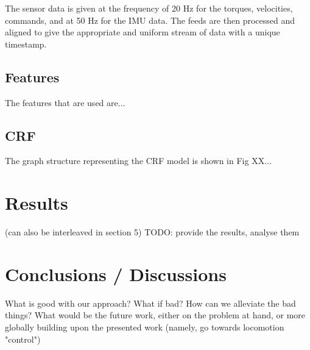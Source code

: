 \documentclass[a4paper, 10pt, conference]{ieeeconf}
\begin{document}
The sensor data is given at the frequency of 20 Hz for the torques, velocities, commands, and at 50 Hz for the IMU data. The feeds are then processed and aligned to give the appropriate and uniform stream of data with a unique timestamp. 

\subsection{Features}
The features that are used are...

\subsection{CRF}

The graph structure representing the CRF model is shown in Fig XX...

\section{Results}

\begin{itshape}(can also be interleaved in section 5)
TODO: provide the results, analyse them
\end{itshape}


\section{Conclusions / Discussions}
 
\begin{itshape}What is good with our approach? What if bad? How can we alleviate the bad things? What would be the future work, either on the problem at hand, or more globally building upon the presented work (namely, go towards locomotion "control")
\end{itshape}
 
\end{document}
